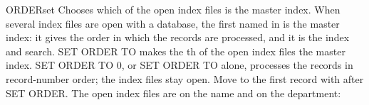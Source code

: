 \begin{XbaseEntry}{ORDER}{set}
Chooses which of the open index files is the master index.
\Syntax
{}
\Usage
When several index files are open with a database, the first named in
 is the master index: it gives the order in which the records are
processed, and it is the index  and  search.  SET ORDER
TO  makes the th of the open index files the master index.  SET
ORDER TO 0, or SET ORDER TO alone, processes the records in record-number
order; the index files stay open.
\Tips
Move to the first record with  after SET ORDER.
\Examples
The open index files are on the name and on the department:
\end{XbaseEntry}

